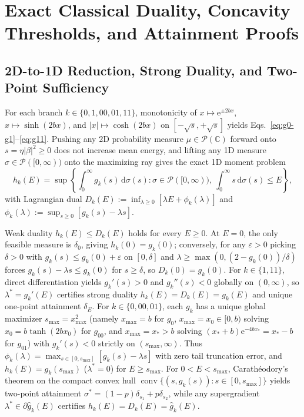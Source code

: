 \documentclass{iopjournal}
\newcommand{\conv}{\operatorname{conv}}
\newcommand{\Pset}{\mathcal{P}}
\newcommand{\abs}[1]{\lvert #1\rvert}
\newcommand{\dd}{\mathrm{d}}
\newcommand{\ee}{\mathrm{e}}
\begin{document}
\appendix
\renewcommand{\thetable}{A\arabic{table}}
\setcounter{table}{0}
\renewcommand{\theHtable}{A\arabic{table}}
\renewcommand{\thefigure}{A\arabic{figure}}
\setcounter{figure}{0}
\renewcommand{\theHfigure}{A\arabic{figure}}

\section{Exact Classical Duality, Concavity Thresholds, and Attainment Proofs}\label{app:classical-dual}

\subsection{2D-to-1D Reduction, Strong Duality, and Two-Point Sufficiency}\label{app:strong-duality}
For each branch $k \in \{0, 1, 00, 01, 11\}$, monotonicity of $x \mapsto \ee^{\pm 2bx}$, $x \mapsto \sinh(2bx)$, and $\abs{x} \mapsto \cosh(2bx)$ on $[-\sqrt{s}, +\sqrt{s}]$ yields Eqs.~\eqref{eq:g0-g1}--\eqref{eq:g11}. Pushing any 2D probability measure $\mu \in \Pset(\mathbb{C})$ forward onto $s = \eta\abs{\beta}^2 \ge 0$ does not increase mean energy, and lifting any 1D measure $\sigma \in \Pset([0,\infty))$ onto the maximizing ray gives the exact 1D moment problem
\begin{equation}\label{eq:1d-moment}
h_k(E) = \sup\left\{\int_0^\infty g_k(s)\,\dd\sigma(s) : \sigma \in \Pset([0,\infty)),\ \int_0^\infty s\,\dd\sigma(s) \le E\right\},
\end{equation}
with Lagrangian dual $D_k(E) := \inf_{\lambda \ge 0}[\lambda E + \phi_k(\lambda)]$ and $\phi_k(\lambda) := \sup_{s \ge 0}[g_k(s) - \lambda s]$.

Weak duality $h_k(E) \le D_k(E)$ holds for every $E \ge 0$. At $E = 0$, the only feasible measure is $\delta_0$, giving $h_k(0) = g_k(0)$; conversely, for any $\varepsilon > 0$ picking $\delta > 0$ with $g_k(s) \le g_k(0) + \varepsilon$ on $[0,\delta]$ and $\lambda \ge \max(0, (2-g_k(0))/\delta)$ forces $g_k(s) - \lambda s \le g_k(0)$ for $s \ge \delta$, so $D_k(0) = g_k(0)$. For $k \in \{1, 11\}$, direct differentiation yields $g_k'(s) > 0$ and $g_k''(s) < 0$ globally on $(0,\infty)$, so $\lambda^* = g_k'(E)$ certifies strong duality $h_k(E) = D_k(E) = g_k(E)$ and unique one-point attainment $\delta_E$. For $k \in \{0, 00, 01\}$, each $g_k$ has a unique global maximizer $s_{\max} = x_{\max}^2$ (namely $x_{\max} = b$ for $g_0$, $x_{\max} = x_0 \in [0,b)$ solving $x_0 = b\tanh(2bx_0)$ for $g_{00}$, and $x_{\max} = x_* > b$ solving $(x_*+b)\ee^{-4bx_*} = x_* - b$ for $g_{01}$) with $g_k'(s) < 0$ strictly on $(s_{\max},\infty)$. Thus $\phi_k(\lambda) = \max_{s\in[0,s_{\max}]}[g_k(s)-\lambda s]$ with zero tail truncation error, and $h_k(E) = g_k(s_{\max})$ ($\lambda^* = 0$) for $E \ge s_{\max}$. For $0 < E < s_{\max}$, Carath\'eodory's theorem on the compact convex hull $\conv\{(s,g_k(s)) : s \in [0, s_{\max}]\}$ yields two-point attainment $\sigma^* = (1-p)\delta_{s_1} + p\delta_{s_2}$, while any supergradient $\lambda^* \in \partial \widehat{g}_k(E)$ certifies $h_k(E) = D_k(E) = \widehat{g}_k(E)$.
\end{document}
